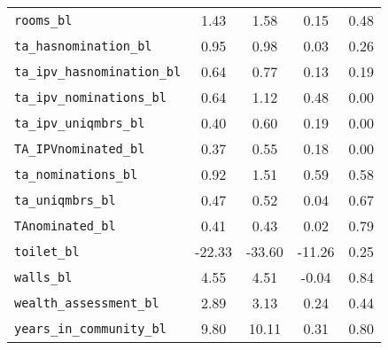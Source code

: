 \begin{longtable}{lcccc}
\texttt{rooms\_bl} & 1.43 & 1.58 & 0.15 & 0.48\\
\texttt{ta\_hasnomination\_bl} & 0.95 & 0.98 & 0.03 & 0.26\\
\texttt{ta\_ipv\_hasnomination\_bl} & 0.64 & 0.77 & 0.13 & 0.19\\
\addlinespace
\texttt{ta\_ipv\_nominations\_bl} & 0.64 & 1.12 & 0.48 & 0.00\\
\texttt{ta\_ipv\_uniqmbrs\_bl} & 0.40 & 0.60 & 0.19 & 0.00\\
\texttt{TA\_IPVnominated\_bl} & 0.37 & 0.55 & 0.18 & 0.00\\
\texttt{ta\_nominations\_bl} & 0.92 & 1.51 & 0.59 & 0.58\\
\texttt{ta\_uniqmbrs\_bl} & 0.47 & 0.52 & 0.04 & 0.67\\
\addlinespace
\texttt{TAnominated\_bl} & 0.41 & 0.43 & 0.02 & 0.79\\
\texttt{toilet\_bl} & -22.33 & -33.60 & -11.26 & 0.25\\
\texttt{walls\_bl} & 4.55 & 4.51 & -0.04 & 0.84\\
\texttt{wealth\_assessment\_bl} & 2.89 & 3.13 & 0.24 & 0.44\\
\texttt{years\_in\_community\_bl} & 9.80 & 10.11 & 0.31 & 0.80\\*
\end{longtable}
